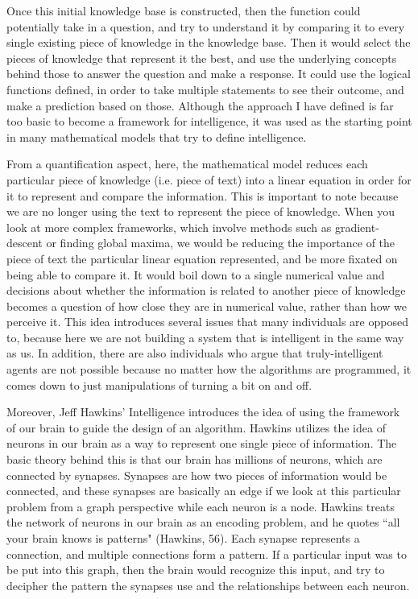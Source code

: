 \documentclass[11pt, oneside]{article}
\begin{document}
\par Once this initial knowledge base is constructed, then the function could potentially take in a question, and try to understand it by comparing it to every single existing piece of knowledge in the knowledge base. Then it would select the pieces of knowledge that represent it the best, and use the underlying concepts behind those to answer the question and make a response. It could use the logical functions defined, in order to take multiple statements to see their outcome, and make a prediction based on those. Although the approach I have defined is far too basic to become a framework for intelligence, it was used as the starting point in many mathematical models that try to define intelligence. 

\par From a quantification aspect, here, the mathematical model reduces each particular piece of knowledge (i.e. piece of text) into a linear equation in order for it to represent and compare the information. This is important to note because we are no longer using the text to represent the piece of knowledge. When you look at more complex frameworks, which involve methods such as gradient-descent or finding global maxima, we would be reducing the importance of the piece of text the particular linear equation represented, and be more fixated on being able to compare it. It would boil down to a single numerical value and decisions about whether the information is related to another piece of knowledge becomes a question of how close they are in numerical value, rather than how we perceive it. This idea introduces several issues that many individuals are opposed to, because here we are not building a system that is intelligent in the same way as us. In addition, there are also individuals who argue that truly-intelligent agents are not possible because no matter how the algorithms are programmed, it comes down to just manipulations of turning a bit on and off. 

\par Moreover, Jeff Hawkins' Intelligence introduces the idea of using the framework of our brain to guide the design of an algorithm. Hawkins utilizes the idea of neurons in our brain as a way to represent one single piece of information. The basic theory behind this is that our brain has millions of neurons, which are connected by synapses. Synapses are how two pieces of information would be connected, and these synapses are basically an edge if we look at this particular problem from a graph perspective while each neuron is a node. Hawkins treats the network of neurons in our brain as an encoding problem, and he quotes ``all your brain knows is patterns" (Hawkins, 56). Each synapse represents a connection, and multiple connections form a pattern. If a particular input was to be put into this graph, then the brain would recognize this input, and try to decipher the pattern the synapses use and the relationships between each neuron. 
\end{document}
